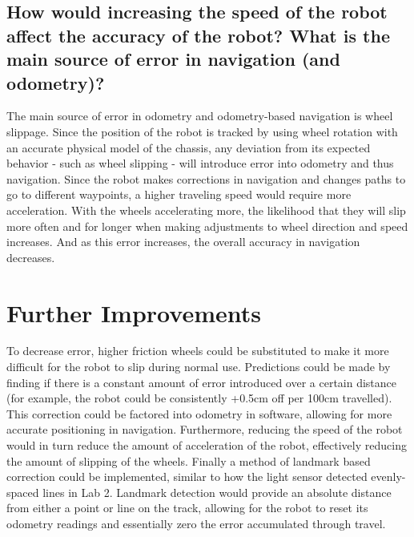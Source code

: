 \documentclass[11pt]{article}
\begin{document}

\subsection{How would increasing the speed of the robot affect the accuracy of the robot? What is
the main source of error in navigation (and odometry)?}
The main source of error in odometry and odometry-based navigation is wheel slippage. Since the
position of the robot is tracked by using wheel rotation with an accurate physical model of the
chassis, any deviation from its expected behavior - such as wheel slipping - will introduce error
into odometry and thus navigation. Since the robot makes corrections in navigation and changes paths
to go to different waypoints, a higher traveling speed would require more acceleration. With the
wheels accelerating more, the likelihood that they will slip more often and for longer when making
adjustments to wheel direction and speed increases. And as this error increases, the overall
accuracy in navigation decreases.

\section{Further Improvements}
To decrease error, higher friction wheels could be substituted to make it more difficult for the
robot to slip during normal use. 
Predictions could be made by finding if there is a constant amount of error introduced over a
certain distance (for example, the robot could be consistently +0.5cm off per 100cm travelled). This
correction could be factored into odometry in software, allowing for more accurate positioning in
navigation. Furthermore, reducing the speed of the robot would in turn reduce the amount of
acceleration of the robot, effectively reducing the amount of slipping of the wheels. Finally a
method of landmark based correction could be implemented, similar to how the light
sensor detected evenly-spaced lines in Lab 2. Landmark detection would provide an absolute distance
from either a point or line on the track, allowing for the robot to reset its odometry readings and
essentially zero the error accumulated through travel.
\end{document}
